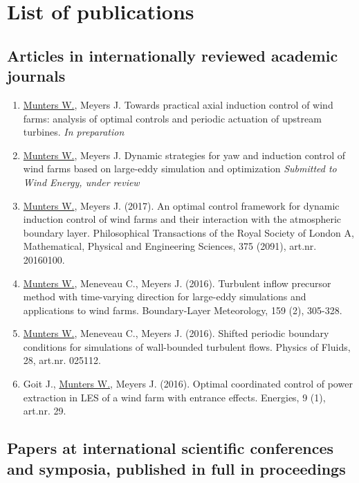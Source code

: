 \chapter{List of publications}

\section*{Articles in internationally reviewed academic journals}

\begin{enumerate}
	
\item \underline{Munters W.}, Meyers J. Towards practical axial induction control of wind farms: analysis of optimal controls and periodic actuation of upstream turbines. \emph{In preparation}	
	
\item \underline{Munters W.}, Meyers J. Dynamic strategies for yaw and induction control of wind farms based on large-eddy simulation and optimization \emph{Submitted to Wind Energy, under review}

\item \underline{Munters W.}, Meyers J. (2017). An optimal control framework for dynamic induction control of wind farms and their interaction with the atmospheric boundary layer. Philosophical Transactions of the Royal Society of London A, Mathematical, Physical and Engineering Sciences, 375 (2091), art.nr. 20160100.

\item \underline{Munters W.}, Meneveau C., Meyers J. (2016). Turbulent inflow precursor method with time-varying direction for large-eddy simulations and applications to wind farms. Boundary-Layer Meteorology, 159 (2), 305-328.

\item \underline{Munters W.}, Meneveau C., Meyers J. (2016). Shifted periodic boundary conditions for simulations of wall-bounded turbulent flows. Physics of Fluids, 28, art.nr. 025112.

\item Goit J., \underline{Munters W.}, Meyers J. (2016). Optimal coordinated control of power extraction in LES of a wind farm with entrance effects. Energies, 9 (1), art.nr. 29.
\end{enumerate}


\section*{Papers at international scientific conferences and symposia, published in full in proceedings}

